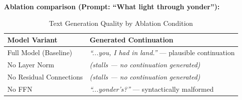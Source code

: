 \documentclass[12pt,a4paper]{article}
\begin{document}
\textbf{Ablation comparison (Prompt: ``What light through yonder''):}

\begin{table}[H]
\centering
\caption{Text Generation Quality by Ablation Condition}
\renewcommand{\arraystretch}{1.3}
\begin{tabular}{L{4cm}L{8cm}}
  \toprule
  \textbf{Model Variant} & \textbf{Generated Continuation} \\
  \midrule
  Full Model (Baseline)   & \textit{``...you, I had in land.''} — plausible continuation \\
  No Layer Norm           & \textit{(stalls — no continuation generated)} \\
  No Residual Connections & \textit{(stalls — no continuation generated)} \\
  No FFN                  & \textit{``...yonder's?''} — syntactically malformed \\
  \bottomrule
\end{tabular}
\end{table}
\end{document}
